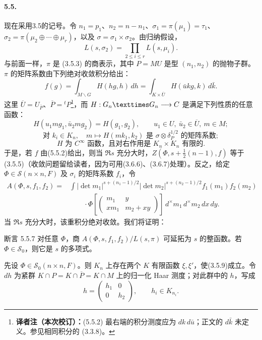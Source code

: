 \paragraph*{5.5.}
现在采用3.5的记号。令 $n_1=p_1$、$n_2=n-n_1$、$\sigma_1=\pi(\mu_1)=\tau_1$、$\sigma_2=\pi(\mu_2\oplus\cdots\oplus\mu_r)$，以及 $\sigma=\sigma_1\times\sigma_2$。由归纳假设，
\[
 L(s,\sigma_2)=\prod_{2\leq i\leq r}L(s,\mu_i).\tag{5.5.1}
\]
与前面一样，$\pi$ 是 (3.5.3) 的商表示，其中 $P=MU$ 是型 $(n_1,n_2)$ 的抛物子群。$\pi$ 的矩阵系数由下列绝对收敛积分给出：
\[
 f(g)=\int_{M\backslash G}H(hg,h)\,dh
 =\int_{K\times\overline U}H(\bar u kg,k)\,d\bar k.\tag{5.5.2}
\]
这里 $\overline U=U_{\overline P}$、$\overline P={}^tP$\footnote{\textbf{译者注（本次校订）：}(5.5.2) 最右端的积分测度应为 $dk\,d\bar u$；正文的 $d\bar k$ 未定义。参见相同积分的 (3.3.8)。}，而 $H:G_n\times G_n\longrightarrow\C$ 是满足下列性质的任意函数：
\[
 H(u_1mg_1,\bar u_2mg_2)=H(g_1,g_2),\qquad
 u_1\in U,\ \bar u_2\in\overline U,\ m\in M;\tag{5.5.3}
\]
\[
 \text{对 }k_i\in K_n,\quad m\longmapsto H(mk_1,k_2)
 \text{ 是 }\sigma\otimes\delta_P^{1/2}\text{ 的矩阵系数};\tag{5.5.4}
\]
\[
 H\text{ 为 }C^\infty\text{ 函数，且对右作用是 }K_n\times K_n\text{ 有限的}.\tag{5.5.5}
\]
于是，若 $f$ 由(5.5.2)给出，则当 $\Re s$ 充分大时，$Z(\Phi,s+\tfrac12(n-1),f)$ 等于(3.5.5)（收敛问题留给读者，因为可用(3.6.6)、(3.6.7)处理）。反之，给定 $\Phi\in\mathcal S(n\times n,F)$ 及 $\sigma_i$ 的矩阵系数 $f_i$，令
\[
\begin{split}
 A(\Phi,s,f_1,f_2)={}&\int |\det m_1|^{s+(n_1-1)/2}|\det m_2|^{s+(n_2-1)/2}
 f_1(m_1)f_2(m_2)\\
 &\qquad\cdot\Phi\!\left[\begin{pmatrix}m_1&y\\xm_1&m_2+xy\end{pmatrix}\right]
 \,d^\times m_1\,d^\times m_2\,dx\,dy .
\end{split}\tag{5.5.6}
\]
当 $\Re s$ 充分大时，该重积分绝对收敛。我们将证明：
\begin{originaltheorem}{断言 5.5.7}
对任意 $\Phi$，商 $A(\Phi,s,f_1,f_2)/L(s,\pi)$ 可延拓为 $s$ 的整函数。若 $\Phi\in\mathcal S_0$，则它是 $s$ 的多项式。
\end{originaltheorem}
先设 $\Phi\in\mathcal S_0(n\times n,F)$。则 $K_n$ 上存在两个 $K$ 有限函数 $\xi,\xi'$，使(3.5.9)成立。令 $dh$ 为紧群 $K\cap P=K\cap\overline P=K\cap M$ 上的归一化 Haar 测度；对此群中的 $h$，写成
\[
 h=\begin{pmatrix}h_1&0\\0&h_2\end{pmatrix},\qquad h_i\in K_{n_i}.\tag{5.5.8}
\]
